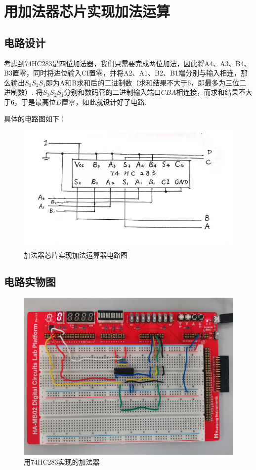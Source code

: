 \documentclass[UTF8]{ctexart}
\begin{document}
{\section{用加法器芯片实现加法运算}
\subsection{电路设计}
考虑到74HC283是四位加法器，我们只需要完成两位加法，因此将A4、A3、B4、B3置零，同时将进位输入CI置零，并将A2、A1、B2、B1端分别与输入相连，那么输出$S_3S_2S_1$即为A和B求和后的二进制数（求和结果不大于6，即最多为三位二进制数）. 将$S_3S_2S_1$分别和数码管的二进制输入端口$CBA$相连接，而求和结果不大于6，于是最高位$D$置零，如此就设计好了电路.\par
具体的电路图如下：
\begin{figure}[H]\centering
    {
        \includegraphics[scale=0.1]{7.jpg}
        \caption{加法器芯片实现加法运算器电路图}
    }
\end{figure}\par
\subsection{电路实物图}
\begin{figure}[H]\centering
    {
        \includegraphics[scale=0.06]{30.jpg}
        \caption{用74HC283实现的加法器}
    }
\end{figure}\par
\vspace{-2em}
}
\end{document}
